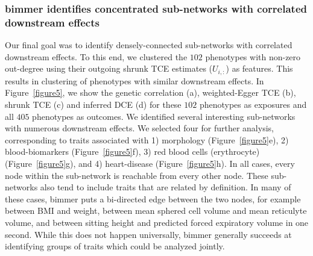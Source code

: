 \documentclass{article}
\begin{document}
\subsubsection*{bimmer identifies concentrated sub-networks with correlated downstream effects}
Our final goal was to identify densely-connected sub-networks with correlated downstream effects.
To this end, we clustered the $102$ phenotypes with non-zero out-degree using their
outgoing shrunk TCE estimates ($U_{i, :}$) as features.
This results in clustering of phenotypes with similar downstream effects.
In Figure~\ref{figure5}, we show the genetic correlation (a), weighted-Egger TCE (b), shrunk TCE (c) and
inferred DCE (d) for these $102$ phenotypes as exposures and all $405$ phenotypes as outcomes.
We identified several interesting sub-networks with numerous downstream effects. We selected four
for further analysis, corresponding to traits associated with 1) morphology (Figure~\ref{figure5}e),
2) blood-biomarkers (Figure~\ref{figure5}f), 3) red blood cells (erythrocyte) (Figure~\ref{figure5}g),
and 4)  heart-disease (Figure~\ref{figure5}h).
In all cases, every node within the sub-network is reachable from every other node. 
These sub-networks also tend to include traits that are related by definition. In many of these cases,
bimmer puts a bi-directed edge between the two nodes, for example between BMI and weight,
between mean sphered cell volume and mean reticulyte volume, and between
sitting height and predicted forced expiratory volume in one second. While this does not happen universally,
bimmer generally succeeds at identifying groups of traits which could be analyzed jointly. 
\end{document}
